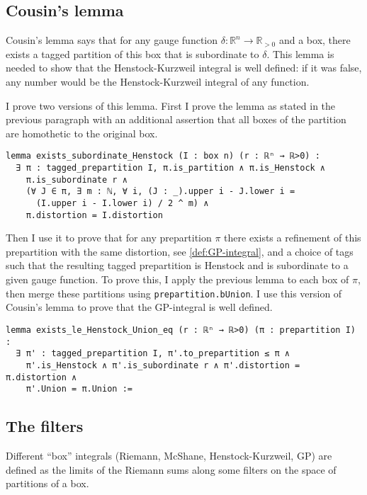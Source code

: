 \documentclass[a4paper, UKenglish,cleveref, autoref, thm-restate]{lipics-v2021}
\newcommand{\bbR}{\mathbb{R}}
\begin{document}
\subsection{Cousin's lemma}\label{sec:cousins-lemma}

Cousin's lemma says that for any gauge function
\(\delta\colon\bbR^{n}\to\bbR_{>0}\) and a box, there exists a tagged
partition of this box that is subordinate to \(\delta\). This lemma is
needed to show that the Henstock-Kurzweil integral is well defined: if
it was false, any number would be the Henstock-Kurzweil integral of
any function.

I prove two versions of this lemma. First I prove the lemma as stated
in the previous paragraph with an additional assertion that all boxes
of the partition are homothetic to the original box.

\begin{lstlisting}[caption={Cousin's lemma, version 1}]
lemma exists_subordinate_Henstock (I : box n) (r : ℝⁿ → ℝ>0) :
  ∃ π : tagged_prepartition I, π.is_partition ∧ π.is_Henstock ∧
    π.is_subordinate r ∧
    (∀ J ∈ π, ∃ m : ℕ, ∀ i, (J : _).upper i - J.lower i =
      (I.upper i - I.lower i) / 2 ^ m) ∧
    π.distortion = I.distortion
\end{lstlisting}

Then I use it to prove that for any prepartition \(\pi\) there exists
a refinement of this prepartition with the same distortion, see
\autoref{def:GP-integral}, and a choice of tags such that the
resulting tagged prepartition is Henstock and is subordinate to a
given gauge function. To prove this, I apply the previous lemma to
each box of \(\pi\), then merge these partitions using
\lstinline=prepartition.bUnion=. I use this version of Cousin's lemma
to prove that the GP-integral is well defined.

\begin{lstlisting}[caption={Cousin's lemma, version 2}]
lemma exists_le_Henstock_Union_eq (r : ℝⁿ → ℝ>0) (π : prepartition I) :
  ∃ π' : tagged_prepartition I, π'.to_prepartition ≤ π ∧
    π'.is_Henstock ∧ π'.is_subordinate r ∧ π'.distortion = π.distortion ∧
    π'.Union = π.Union :=
\end{lstlisting}

\subsection{The filters}\label{sec:filters}

Different “box” integrals (Riemann, McShane, Henstock-Kurzweil, GP)
are defined as the limits of the Riemann sums along some filters on
the space of partitions of a box.
\end{document}
